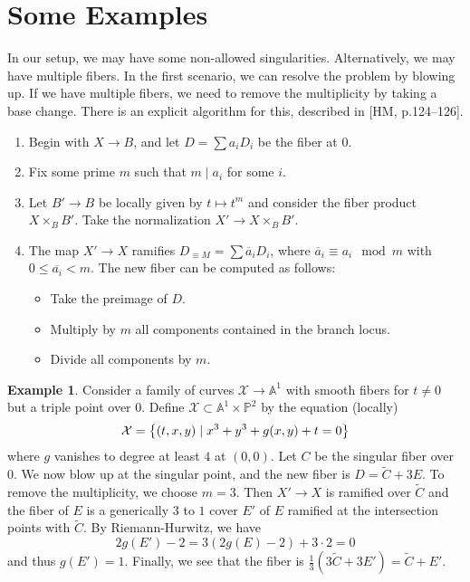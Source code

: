 \documentclass[leqno, openany]{memoir}
\theoremstyle{definition}
\newtheorem{exm}[thm]{Example}
\theoremstyle{remark}
\theoremstyle{plain}
\theoremstyle{definition}
\theoremstyle{remark}
\newcommand{\A}{\mathbb{A}}
\renewcommand{\P}{\mathbb{P}}
\newcommand{\mc}[1]{\mathcal{#1}}
\newcommand{\ol}[1]{\overline{#1}}
\newcommand{\wt}[1]{\widetilde{#1}}
\begin{document}
\section{Some Examples}%

In our setup, we may have some non-allowed singularities. Alternatively, we may
have multiple fibers. In the first scenario, we can resolve the problem by
blowing up. If we have multiple fibers, we need to remove the multiplicity by
taking a base change. There is an explicit algorithm for this, described in
[HM, p.124--126].

\begin{enumerate} \item Begin with $X \to B$, and let $D = \sum a_i D_i$ be the
    fiber at $0$.  \item Fix some prime $m$ such that $m \mid a_i$ for some
    $i$.  \item Let $B' \to B$ be locally given by $t \mapsto t^m$ and consider
    the fiber product $X \times_B B'$. Take the normalization $X' \to X
    \times_B B'$.  \item The map $X' \to X$ ramifies $D_{\equiv M} = \sum
    \ol{a}_i D_i$, where $\ol{a}_i \equiv a_i \mod m$ with $0 \leq \ol{a_i} <
    m$. The new fiber can be computed as follows: \begin{itemize} \item Take
        the preimage of $D$.  \item Multiply by $m$ all components contained in
the branch locus.  \item Divide all components by $m$.  \end{itemize}
\end{enumerate}

\begin{exm} Consider a family of curves $\mc{X} \to \A^1$ with smooth fibers
    for $t \neq 0$ but a triple point over $0$. Define $\mc{X} \subset \A^1
    \times \P^2$ by the equation (locally) \[ \mc{X} = \qty{(t,x,y) \mid x^3 +
    y^3 + g(x,y) + t = 0} \] where $g$ vanishes to degree at least $4$ at
    $(0,0)$. Let $C$ be the singular fiber over $0$. We now blow up at the
    singular point, and the new fiber is $D = \wt{C} + 3E$. To remove the
    multiplicity, we choose $m = 3$. Then $X' \to X$ is ramified over $\wt{C}$
    and the fiber of $E$ is a generically $3$ to $1$ cover $E'$ of $E$ ramified
    at the intersection points with $\wt{C}$. By Riemann-Hurwitz, we have \[
    2g(E') - 2 = 3(2g(E)-2) + 3 \cdot 2 = 0 \] and thus $g(E') = 1$. Finally,
we see that the fiber is $\frac{1}{3} (3 \wt{C} + 3E') = \wt{C} + E'$.
\end{exm}
\end{document}
